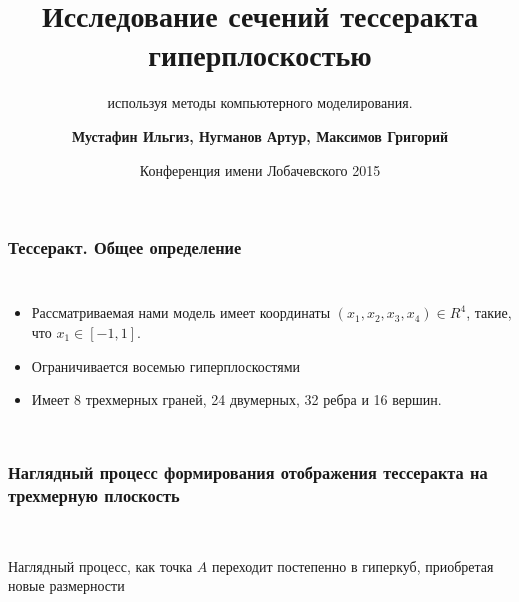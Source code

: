 \documentclass[10pt,pdf,hyperref={unicode}]{beamer}
\title[Математическая модель проекции тессеракта и его сечений гиперплоскостью] %
{ \bfseries Исследование сечений тессеракта гиперплоскостью}
\subtitle{используя методы компьютерного моделирования.}
\author[Мустафин И., Нугманов А., Максимов Г.]
{ \bfseries Мустафин Ильгиз, Нугманов Артур, Максимов Григорий}
\institute[ТТЛ №2] %
{
  { \normalsize МАОУ "Лицей-интернат №2"} \\
  Московского района города Казани
}
\date[2015-03-26] %
{Конференция имени Лобачевского 2015}
\begin{document}
\frame{\titlepage}

\begin{frame}
\frametitle{Тессеракт. Общее определение}

\begin{columns}
	{\small
	\begin{itemize}
		\item Рассматриваемая нами модель имеет координаты $(x_1,x_2,x_3,x_4) \in R^4$, такие, что $x_1 \in [ -1,1 ]$. 
		\item Ограничивается восемью гиперплоскостями	
		\item Имеет 8 трехмерных граней, 24 двумерных, 32 ребра и 16 вершин.
	\end{itemize}
}
	\clearpage
\end{columns}
\end{frame}

\begin{frame}
\frametitle{Наглядный процесс формирования отображения тессеракта на трехмерную плоскость}
\begin{center}
	 \\
\end{center}
Наглядный процесс, как точка $A$ переходит постепенно в гиперкуб, приобретая новые размерности
\end{frame}
\end{document}
